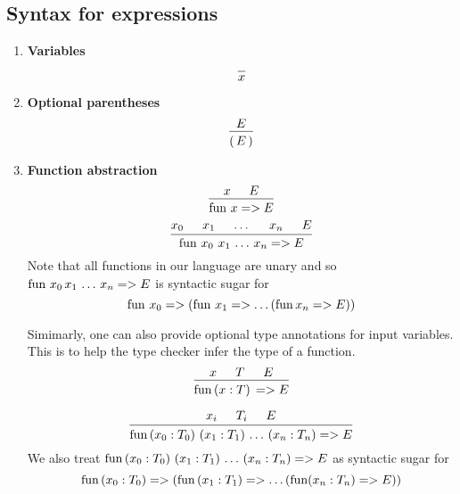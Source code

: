 \documentclass{article}
\begin{document}
\subsection{Syntax for expressions}
\begin{enumerate}
\item \textbf{Variables} \\
  \[
    \begin{prooftree}
      \infer0{x}
    \end{prooftree}
  \]

\item \textbf{Optional parentheses} \\
  \[
    \begin{prooftree}
      \hypo{E}
      \infer1{( \, E \, )}
    \end{prooftree}
  \]
  
\item \textbf{Function abstraction} \\
  \[
    \begin{prooftree}
      \hypo{x}
      \hypo{E}
      \infer2{\fun \, x => E}
    \end{prooftree}
  \]
  \[
    \begin{prooftree}
      \hypo{x_0}
      \hypo{x_1}
      \hypo{\dots}
      \hypo{x_n}
      \hypo{E}
      \infer5{\fun \, x_0 \,\, x_1 \, \dots \, x_n => E}
    \end{prooftree}
  \]
  Note that all functions in our language are unary and so
  $\operatorname{fun} \, x_0 \, x_1 \, \dots \, x_n => E$ is syntactic sugar for
  \[ \operatorname{fun} \, x_0 => (\operatorname{fun} \, x_1 => \dots (\operatorname{fun} x_n => E)) \]

  Simimarly, one can also provide optional type annotations for input variables.
  This is to help the type checker infer the type of a function.
  \[
    \begin{prooftree}
      \hypo{x}
      \hypo{T}
      \hypo{E}
      \infer3{\fun \, (x : T) \, => E}
    \end{prooftree}
  \]

  \[
    \begin{prooftree}
      \hypo{x_i}
      \hypo{T_i}
      \hypo{E}
      \infer3{\fun \, (x_0 : T_0) \,\, (x_1 : T_1) \, \dots \, (x_n : T_n) => E}
    \end{prooftree}
  \]
  We also treat $\operatorname{fun} \, (x_0 : T_0) \,\, (x_1 : T_1) \, \dots \, (x_n : T_n) => E$
  as syntactic sugar for
  \[ \operatorname{fun} \, (x_0 : T_0) => (\operatorname{fun} \, (x_1 : T_1) => \dots (\operatorname{fun} (x_n : T_n) => E)) \]


\end{enumerate}
\end{document}
